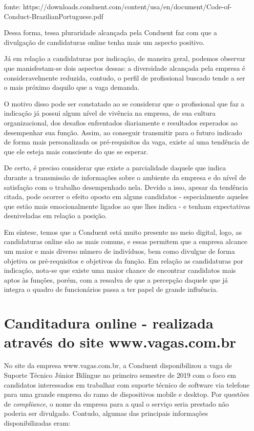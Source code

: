 \documentclass[12pt]{article}
\begin{document}
 fonte:  https://downloads.conduent.com/content/usa/en/document/Code-of-Conduct-BrazilianPortuguese.pdf

Dessa forma, tessa pluraridade alcançada pela Conduent faz com que a divulgação de candidaturas online tenha mais um aspecto positivo. 

Já em relação a candidaturas por indicação, de maneira geral, podemos observar que manisfestam-se dois aspectos dessas: a diversidade alcançada pela empresa é consideravelmente reduzida, contudo, o perfil de profissional buscado tende a ser o mais próximo daquilo que a vaga demanda. 

O motivo disso pode ser constatado ao se considerar que o profissional que faz a indicação já possui algum nível de vivência na empresa, de sua cultura organizacional, dos desafios enfrentados diariamente e resultados esperados ao desempenhar sua função. Assim, ao conseguir transmitir para o futuro indicado de forma mais personalizada os pré-requisitos da vaga, existe aí uma tendência de que ele esteja mais consciente do que se esperar.  

De certo, é preciso considerar que existe a parcialidade daquele que indica durante a transmissão de informações sobre o ambiente da empresa e do nível de satisfação com o trabalho desempenhado nela. Devido a isso, apesar da tendência citada, pode ocorrer o efeito oposto em alguns candidatos - especialmente aqueles que estão mais emocionalmente ligados ao que lhes indica - e tenham expectativas desniveladas em relação a posição.

Em síntese, temos que a Conduent está muito presente no meio digital, logo, as candidaturas online são as mais comuns, e essas permitem que a empresa alcance um maior e mais diverso número de indivíduos, bem como divulgue de forma objetiva os pré-requisitos e objetivos da função. Em relação as candidaturas por indicação, nota-se que existe uma maior chance de encontrar candidatos mais aptos às funções, porém, com a ressalva de que a percepção daquele que já integra o quadro de funcionários passa a ter papel de grande influência.  
 
\section*{Canditadura online - realizada através do site www.vagas.com.br}
 
No site da empresa www.vagas.com.br, a Conduent disponibilizou a vaga de Suporte Técnico Júnior Bilíngue no primeiro semestre de 2019 com o foco em candidatos interessados em trabalhar com suporte técnico de software via telefone para uma grande empresa do ramo de dispositivos mobile e desktop. Por questões de  \emph {compliance}, o nome da empresa para a qual o serviço seria prestado não poderia ser divulgado. Contudo, algumas das principais informações disponibilizadas eram: 
 
\end{document}
